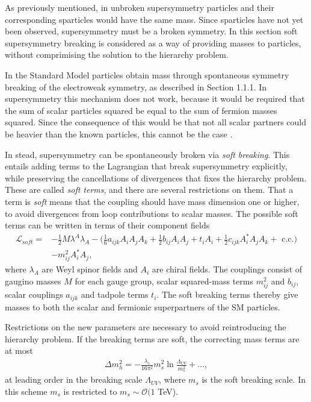 \documentclass[twoside,english]{uiofysmaster}
\begin{document}
As previously mentioned, in unbroken supersymmetry particles and their corresponding sparticles would have the same mass. Since sparticles have not yet been observed, supersymmetry must be a broken symmetry. In this section soft supersymmetry breaking is considered as a way of providing masses to particles, without comprimising the solution to the hierarchy problem.

In the Standard Model particles obtain mass through spontaneous symmetry breaking of the electroweak symmetry, as described in Section 1.1.1. In supersymmetry this mechanism does not work, because it would be required that the sum of scalar particles squared be equal to the sum of fermion masses squared. Since the consequence of this would be that not all scalar partners could be heavier than the known particles, this cannot be the case \cite{batzing2017lecture}. 

In stead, supersymmetry can be spontaneously broken via \textit{soft breaking}. This entails adding terms to the Lagrangian that break supersymmetry explicitly, while preserving the cancellations of divergences that fixes the hierarchy problem. These are called \textit{soft terms}, and there are several restrictions on them. That a term is \textit{soft} means that the coupling should have mass dimension one or higher, to avoid divergences from loop contributions to scalar masses. The possible soft terms can be written in terms of their component fields
\begin{align}
\mathcal{L}_{soft} =& - \frac{1}{2} M \lambda^A \lambda_A - \Big(\frac{1}{6} a_{ijk} A_i A_j A_k + \frac{1}{2} b_{ij} A_i A_j + t_i A_i + \frac{1}{2} c_{ijk} A^{*}_i A_jA_k + \text{ c.c.} \Big) \nonumber \\& - m_{ij}^2 A_i^*A_j,
\end{align}
where $\lambda_A$ are Weyl spinor fields and $A_i$ are chiral fields. The couplings consist of gaugino masses $M$ for each gauge group, scalar squared-mass terms $m_{ij}^2$ and $b_{ij}$, scalar couplings $a_{ijk}$ and tadpole terms $t_i$. The soft breaking terms thereby give masses to both the scalar and fermionic superpartners of the SM particles.

Restrictions on the new parameters are necessary to avoid reintroducing the hierarchy problem. If the breaking terms are soft, the correcting mass terms are at most
\begin{align*}
\Delta m_h^2 = - \frac{\lambda_s}{16 \pi^2} m_s^2\ln \frac{\Lambda_{UV}}{m_s^2} +...,
\end{align*}
at leading order in the breaking scale $\Lambda_{UV}$, where $m_s$ is the soft breaking scale. In this scheme $m_s$ is restricted to $m_s \sim \mathcal{O}(1$ TeV).
\end{document}
